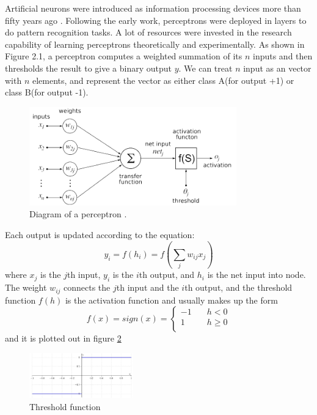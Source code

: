 Artificial neurons were introduced as information processing devices more than fifty years ago \citep{mcculloch1943logical}. Following the early work, perceptrons were deployed in layers to do pattern recognition tasks. A lot of resources were invested in the research capability of learning perceptrons theoretically and experimentally. As shown in Figure 2.1, a perceptron computes a weighted summation of its $n$ inputs and then thresholds the result to give a binary output $y$. We can treat $n$ input as an vector with $n$ elements, and represent the vector as either class A(for output +1) or class B(for output -1).
\graphicspath{ {./Figures/} }
\begin{figure}[!htb]
\centering
\includegraphics[width=0.8\textwidth]{Figure2-1.png}
\caption{\label{fig:perceptron}Diagram of a perceptron \citep{NeuronFigure1}.}
\end{figure}

Each output is updated according to the equation:
\begin{equation}\label{eq:BasicEq}
y_{i} = f(h_{i}) = f\left(\sum_{j}w_{ij}x_{j}\right)
\end{equation}
where $x_{j}$ is the $j$th input, $y_{i}$ is the $i$th output, and $h_{i}$ is the net input into node. The weight $w_{ij}$ connects the $j$th input and the $i$th output, and the threshold function $f(h)$ is the activation function and usually makes up the form
\begin{equation}\label{eq:FullEq}
f(x) = sign(x) = 
  \begin{cases}
    -1       & \quad h < 0 \\
    1  & \quad h \geq 0\\
  \end{cases}
\end{equation}
and it is plotted out in figure \ref{fig:ThresholdFunc}
\graphicspath{ {./Figures/} }
\begin{figure}[!htb]
\centering
\includegraphics[width=0.4\textwidth]{ThresholdFunc.jpeg}
\caption{\label{fig:ThresholdFunc}Threshold function}
\end{figure}

